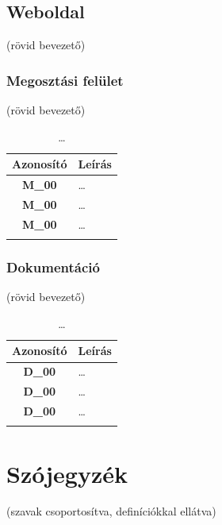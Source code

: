 \documentclass{article}
\begin{document}
\subsection{Weboldal}
(rövid bevezető)

\subsubsection{Megosztási felület}
(rövid bevezető)

\begingroup
\centering
\begin{longtable}{|c|p{14cm}|}
\hline
\textbf{Azonosító} & \textbf{Leírás}        \\ 
\hline
       \textbf{M\_00}  & … \\\hline
       \textbf{M\_00}  & … \\\hline
       \textbf{M\_00}  & … \\\hline
\hline
\caption{…}
\end{longtable}
\endgroup


\subsubsection{Dokumentáció}
(rövid bevezető)

\begingroup
\centering
\begin{longtable}{|c|p{14cm}|}
\hline
\textbf{Azonosító} & \textbf{Leírás}        \\ 
\hline
       \textbf{D\_00}  & … \\\hline
       \textbf{D\_00}  & … \\\hline
       \textbf{D\_00}  & … \\\hline
\hline
\caption{…}
\end{longtable}
\endgroup


\pagebreak
\section{Szójegyzék}

(szavak csoportosítva, definíciókkal ellátva)
\end{document}

